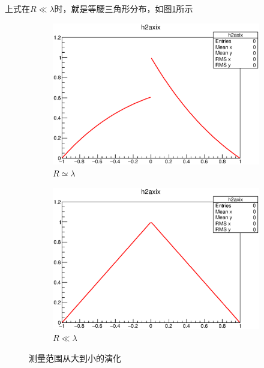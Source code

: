 上式在$R\ll\lambda$时，就是等腰三角形分布，如图\ref{fig:interval_pdf}所示
\begin{figure}[htbp]
	\centering
	\begin{subfigure}[b]{0.48\textwidth}
        \includegraphics[width=\textwidth]{fig/interval_pdf_largerange.eps}
        \caption{$R\simeq\lambda$}
    \end{subfigure}
    \begin{subfigure}[b]{0.48\textwidth}
        \includegraphics[width=\textwidth]{fig/interval_pdf_smallrange.eps}
        \caption{$R\ll\lambda$}
    \end{subfigure}
	\caption{测量范围从大到小的演化}
	\label{fig:interval_pdf}
\end{figure}


